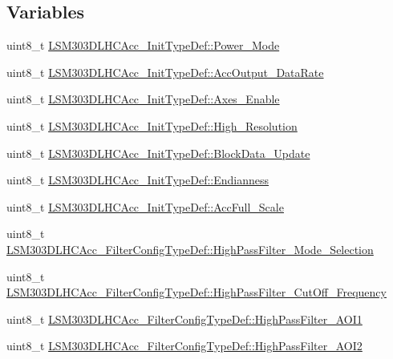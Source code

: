 \subsection*{Variables}
\begin{DoxyCompactItemize}
\item 
uint8\+\_\+t \hyperlink{group__Mag__Temperature__Sensor_gaa57e93d62ad4bd61d8da81b3fec26a13}{L\+S\+M303\+D\+L\+H\+C\+Acc\+\_\+\+Init\+Type\+Def\+::\+Power\+\_\+\+Mode}
\item 
uint8\+\_\+t \hyperlink{group__Mag__Temperature__Sensor_ga4068b4c768d1e63eb26fe32ca50a9a34}{L\+S\+M303\+D\+L\+H\+C\+Acc\+\_\+\+Init\+Type\+Def\+::\+Acc\+Output\+\_\+\+Data\+Rate}
\item 
uint8\+\_\+t \hyperlink{group__Mag__Temperature__Sensor_ga41bd683db7b4b32b0cac4ceae21350c4}{L\+S\+M303\+D\+L\+H\+C\+Acc\+\_\+\+Init\+Type\+Def\+::\+Axes\+\_\+\+Enable}
\item 
uint8\+\_\+t \hyperlink{group__Mag__Temperature__Sensor_ga2a5a56ec13b3326b0b9c3fd91bd39c8a}{L\+S\+M303\+D\+L\+H\+C\+Acc\+\_\+\+Init\+Type\+Def\+::\+High\+\_\+\+Resolution}
\item 
uint8\+\_\+t \hyperlink{group__Mag__Temperature__Sensor_ga80f3e1243dc8e7e42e465edc94a223c8}{L\+S\+M303\+D\+L\+H\+C\+Acc\+\_\+\+Init\+Type\+Def\+::\+Block\+Data\+\_\+\+Update}
\item 
uint8\+\_\+t \hyperlink{group__Mag__Temperature__Sensor_ga740084aed9645552c055544cc7a24eb9}{L\+S\+M303\+D\+L\+H\+C\+Acc\+\_\+\+Init\+Type\+Def\+::\+Endianness}
\item 
uint8\+\_\+t \hyperlink{group__Mag__Temperature__Sensor_ga1c8b521caab8b30b7bbdf4bd21e6d512}{L\+S\+M303\+D\+L\+H\+C\+Acc\+\_\+\+Init\+Type\+Def\+::\+Acc\+Full\+\_\+\+Scale}
\item 
uint8\+\_\+t \hyperlink{group__Mag__Temperature__Sensor_gace3a2b09252915f5134c1270beaac97b}{L\+S\+M303\+D\+L\+H\+C\+Acc\+\_\+\+Filter\+Config\+Type\+Def\+::\+High\+Pass\+Filter\+\_\+\+Mode\+\_\+\+Selection}
\item 
uint8\+\_\+t \hyperlink{group__Mag__Temperature__Sensor_ga575e9564896f50d0848653a41b07e0b8}{L\+S\+M303\+D\+L\+H\+C\+Acc\+\_\+\+Filter\+Config\+Type\+Def\+::\+High\+Pass\+Filter\+\_\+\+Cut\+Off\+\_\+\+Frequency}
\item 
uint8\+\_\+t \hyperlink{group__Mag__Temperature__Sensor_ga2c5ef17ea22f8968849e174dfd2df98f}{L\+S\+M303\+D\+L\+H\+C\+Acc\+\_\+\+Filter\+Config\+Type\+Def\+::\+High\+Pass\+Filter\+\_\+\+A\+O\+I1}
\item 
uint8\+\_\+t \hyperlink{group__Mag__Temperature__Sensor_ga14d13f561b59497e82a2667236ca52b1}{L\+S\+M303\+D\+L\+H\+C\+Acc\+\_\+\+Filter\+Config\+Type\+Def\+::\+High\+Pass\+Filter\+\_\+\+A\+O\+I2}

\end{DoxyCompactItemize}
